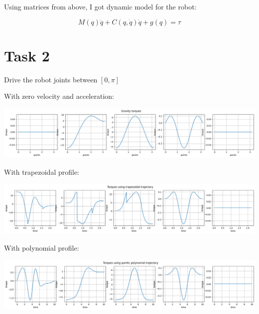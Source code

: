\documentclass{article}
\begin{document}
    Using matrices from above, I got dynamic model for the robot:

    $$M(q) \ddot q + C(q, \dot q) \dot q + g(q) = \tau$$

    \section*{Task 2}

    Drive the robot joints between $[0, \pi]$

    With zero velocity and acceleration: 

    \includegraphics[width=\linewidth]{gravity_torques.png}

    With trapezoidal profile: 

    \includegraphics[width=\linewidth]{trapezoidal_torques.png}

    With polynomial profile: 

    \includegraphics[width=\linewidth]{polynomial_torques.png}
\end{document}
